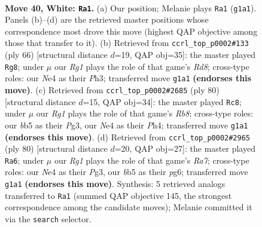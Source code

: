\documentclass[11pt]{article}
\begin{document}
\clearpage

\begin{figure}[p]\centering
\begin{subfigure}{0.46\textwidth}\centering
\resizebox{\linewidth}{!}{%
\newchessgame
\chessboard[
  setfen={6r1/4k3/8/pb2p3/4N3/1P3KP1/8/6R1 w - - 0 40},
  showmover=false,
  pgfstyle=straightmove, color=movearrow, markmove={g1-a1}
]}
\caption{}
\end{subfigure}\hfill
\begin{subfigure}{0.46\textwidth}\centering
\resizebox{\linewidth}{!}{%
\newchessgame
\chessboard[
  setfen={3R4/8/4k1p1/7p/5P2/7P/2r3PK/8 w - - 0 34},
  showmover=false,
  pgfstyle=straightmove, color=movearrow, markmove={d8-g8}
]}
\caption{}
\end{subfigure}
\\[4pt]
\begin{subfigure}{0.46\textwidth}\centering
\resizebox{\linewidth}{!}{%
\newchessgame
\chessboard[
  setfen={1R6/8/1P3k2/7p/2p4P/6PK/1r6/8 w - - 3 41},
  showmover=false,
  pgfstyle=straightmove, color=movearrow, markmove={b8-c8}
]}
\caption{}
\end{subfigure}\hfill
\begin{subfigure}{0.46\textwidth}\centering
\resizebox{\linewidth}{!}{%
\newchessgame
\chessboard[
  setfen={5k2/R7/4p1pp/4P3/8/6P1/2r2PK1/8 w - - 5 41},
  showmover=false,
  pgfstyle=straightmove, color=movearrow, markmove={a7-a6}
]}
\caption{}
\end{subfigure}
\caption{\textbf{Move 40, White: \texttt{Ra1}.} (a) Our position; Melanie plays \texttt{Ra1} (\texttt{g1a1}). Panels (b)--(d) are the retrieved master positions whose correspondence most drove this move (highest QAP objective among those that transfer to it). (b) Retrieved from \texttt{ccrl\_top\_p0002\#133} (ply 66) [structural distance $d$=19, QAP obj=35]: the master played \texttt{Rg8}; under $\mu$ our \emph{Rg1} plays the role of that game's \emph{Rd8}; cross-type roles: our \emph{N}e4 as their \emph{P}h3; transferred move \texttt{g1a1} \textbf{(endorses this move)}. (c) Retrieved from \texttt{ccrl\_top\_p0002\#2685} (ply 80) [structural distance $d$=15, QAP obj=34]: the master played \texttt{Rc8}; under $\mu$ our \emph{Rg1} plays the role of that game's \emph{Rb8}; cross-type roles: our \emph{b}b5 as their \emph{P}g3, our \emph{N}e4 as their \emph{P}h4; transferred move \texttt{g1a1} \textbf{(endorses this move)}. (d) Retrieved from \texttt{ccrl\_top\_p0002\#2965} (ply 80) [structural distance $d$=20, QAP obj=27]: the master played \texttt{Ra6}; under $\mu$ our \emph{Rg1} plays the role of that game's \emph{Ra7}; cross-type roles: our \emph{N}e4 as their \emph{P}g3, our \emph{b}b5 as their \emph{p}g6; transferred move \texttt{g1a1} \textbf{(endorses this move)}. Synthesis: 5 retrieved analogs transferred to \texttt{Ra1} (summed QAP objective 145, the strongest correspondence among the candidate moves); Melanie committed it via the \texttt{search} selector.}
\label{fig:thought-m78}
\end{figure}
\end{document}
